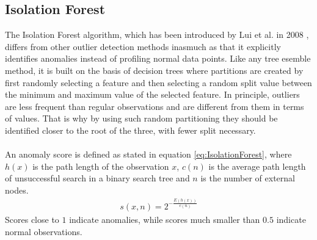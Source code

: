 \subsection{Isolation Forest}
\label{subsec:IsolationForest}
The Isolation Forest algorithm, which has been introduced by Lui et al. in 2008 \cite{IsolationForest}, differs from other outlier detection methods inasmuch as that it explicitly identifies anomalies instead of profiling normal data points. Like any tree esemble method, it is built on the basis of decision trees where partitions are created by first randomly selecting a feature and then selecting a random split value between the minimum and maximum value of the selected feature. In principle, outliers are less frequent than regular observations and are different from them in terms of values. That is why by using such random partitioning they should be identified closer to the root of the three, with fewer split necessary.\\
\\
An anomaly score is defined as stated in equation \ref{eq:IsolationForest}, where $h(x)$ is the path length of the observation $x$, $c(n)$ is the average path length of unsuccessful search in a binary search tree and $n$ is the number of external nodes.
\begin{align}
\label{eq:Isolation Forest}
s(x,n)=2^{-\frac{E(h(x))}{c(n)}}
\end{align}
Scores close to $1$ indicate anomalies, while scores much smaller than $0.5$ indicate normal observations.
